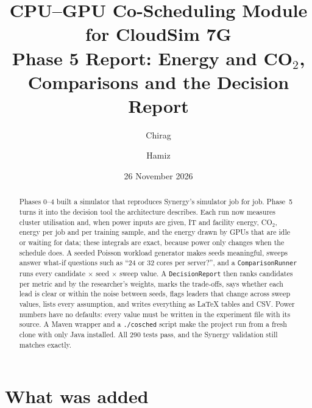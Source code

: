 \documentclass[11pt,a4paper]{article}
\title{CPU--GPU Co-Scheduling Module for CloudSim 7G\\[4pt]
\large Phase 5 Report: Energy and CO$_2$, Comparisons and the Decision Report}
\author{Chirag \and Hamiz}
\date{26 November 2026}
\newcommand{\code}[1]{\texttt{#1}}
\begin{document}
\maketitle

\begin{abstract}
Phases 0--4 built a simulator that reproduces Synergy's simulator job for job. Phase~5 turns it into the
decision tool the architecture describes. Each run now measures cluster utilisation and, when power inputs are
given, IT and facility energy, CO$_2$, energy per job and per training sample, and the energy drawn by GPUs that
are idle or waiting for data; these integrals are exact, because power only changes when the schedule does.
A seeded Poisson workload generator makes seeds meaningful, sweeps answer what-if questions such as
``24 or 32 cores per server?'', and a \code{ComparisonRunner} runs every candidate $\times$ seed $\times$ sweep
value. A \code{DecisionReport} then ranks candidates per metric and by the researcher's weights, marks the
trade-offs, says whether each lead is clear or within the noise between seeds, flags leaders that change across
sweep values, lists every assumption, and writes everything as LaTeX tables and CSV. Power numbers have no
defaults: every value must be written in the experiment file with its source. A Maven wrapper and a
\code{./cosched} script make the project run from a fresh clone with only Java installed. All 290 tests pass,
and the Synergy validation still matches exactly.
\end{abstract}

\tableofcontents

\section{What was added}
\end{document}
